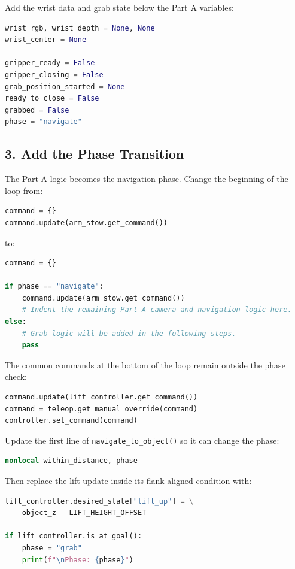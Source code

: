 \documentclass[11pt,a4paper]{article}
\begin{document}
Add the wrist data and grab state below the Part A variables:

\begin{lstlisting}[language=Python]
wrist_rgb, wrist_depth = None, None
wrist_center = None

gripper_ready = False
gripper_closing = False
grab_position_started = None
ready_to_close = False
grabbed = False
phase = "navigate"
\end{lstlisting}

\subsection*{3. Add the Phase Transition}

The Part A logic becomes the navigation phase. Change the beginning of the
loop from:

\begin{lstlisting}[language=Python]
command = {}
command.update(arm_stow.get_command())
\end{lstlisting}

to:

\begin{lstlisting}[language=Python]
command = {}

if phase == "navigate":
    command.update(arm_stow.get_command())
    # Indent the remaining Part A camera and navigation logic here.
else:
    # Grab logic will be added in the following steps.
    pass
\end{lstlisting}

The common commands at the bottom of the loop remain outside the phase check:

\begin{lstlisting}[language=Python]
command.update(lift_controller.get_command())
command = teleop.get_manual_override(command)
controller.set_command(command)
\end{lstlisting}

Update the first line of \texttt{navigate\_to\_object()} so it can change the
phase:

\begin{lstlisting}[language=Python]
nonlocal within_distance, phase
\end{lstlisting}

Then replace the lift update inside its flank-aligned condition with:

\begin{lstlisting}[language=Python]
lift_controller.desired_state["lift_up"] = \
    object_z - LIFT_HEIGHT_OFFSET

if lift_controller.is_at_goal():
    phase = "grab"
    print(f"\nPhase: {phase}")
\end{lstlisting}
\end{document}
